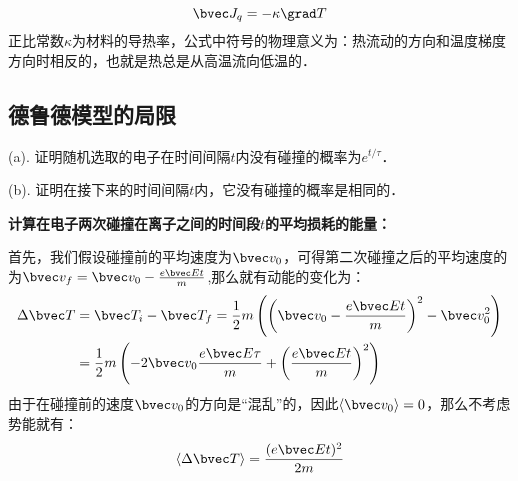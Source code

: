 \begin{equation}
\bvec J_q =-\kappa\grad T
\end{equation}
正比常数$\kappa$为材料的导热率，公式中符号的物理意义为：热流动的方向和温度梯度方向时相反的，也就是热总是从高温流向低温的．
\subsection{德鲁德模型的局限}

\begin{example}{}
(a). 证明随机选取的电子在时间间隔$t$内没有碰撞的概率为$e^{t/\tau}$．

(b). 证明在接下来的时间间隔$t$内，它没有碰撞的概率是相同的．
\end{example}
\begin{example}{}
\textbf{计算在电子两次碰撞在离子之间的时间段$t$的平均损耗的能量：}

首先，我们假设碰撞前的平均速度为$\bvec v_0$，可得第二次碰撞之后的平均速度的为$\bvec v_f=\bvec v_0 -\frac{e\bvec E t}{m}$,那么就有动能的变化为：
\begin{align}
\Delta \bvec T &= \bvec T_i-\bvec T_f=\frac{1}{2}m\left(\left(\bvec v_0 -\frac{e\bvec E t}{m}\right)^2-\bvec v_0^2\right)\\
&=\frac{1}{2}m\left(-2\bvec v_0\frac{e\bvec E \tau}{m}+\left(\frac{e\bvec E t}{m}\right)^2\right)\\
\end{align}
由于在碰撞前的速度$\bvec v_0$的方向是“混乱”的，因此$\langle \bvec v_0\rangle = 0$，那么不考虑势能就有：
\begin{equation}
\langle \Delta \bvec T \rangle = \frac{(e\bvec E t)^2}{2m}
\end{equation}
\end{example}
